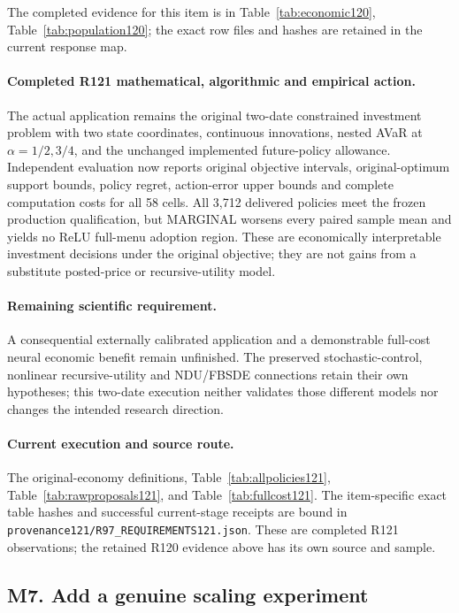 The completed evidence for this item is in Table~\ref{tab:economic120}, Table~\ref{tab:population120}; the exact row files and hashes are retained in the current response map.

\paragraph{Completed R121 mathematical, algorithmic and empirical action.}
The actual application remains the original two-date constrained investment problem with two state coordinates, continuous innovations, nested AVaR at $\alpha=1/2,3/4$, and the unchanged implemented future-policy allowance. Independent evaluation now reports original objective intervals, original-optimum support bounds, policy regret, action-error upper bounds and complete computation costs for all 58 cells. All 3,712 delivered policies meet the frozen production qualification, but MARGINAL worsens every paired sample mean and yields no ReLU full-menu adoption region. These are economically interpretable investment decisions under the original objective; they are not gains from a substitute posted-price or recursive-utility model.

\paragraph{Remaining scientific requirement.}
A consequential externally calibrated application and a demonstrable full-cost neural economic benefit remain unfinished. The preserved stochastic-control, nonlinear recursive-utility and NDU/FBSDE connections retain their own hypotheses; this two-date execution neither validates those different models nor changes the intended research direction.

\paragraph{Current execution and source route.}
The original-economy definitions, Table~\ref{tab:allpolicies121}, Table~\ref{tab:rawproposals121}, and Table~\ref{tab:fullcost121}.
The item-specific exact table hashes and successful current-stage receipts are bound in \nolinkurl{provenance121/R97_REQUIREMENTS121.json}. These are completed R121 observations; the retained R120 evidence above has its own source and sample.

\subsection{M7. Add a genuine scaling experiment}
\label{response121:M7}

